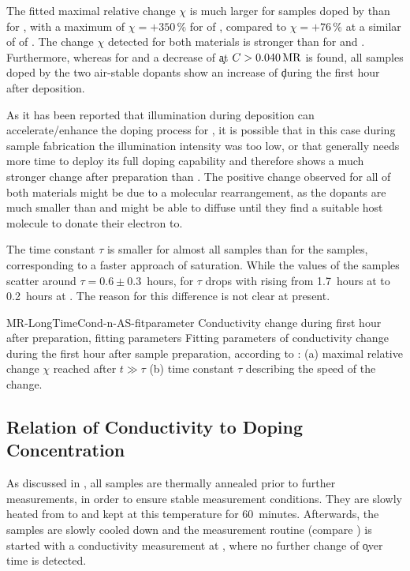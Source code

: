 The fitted maximal relative change $\chi$ is much larger for samples doped by \aob than for \dmbi, with a maximum of $\chi=+350\,\percent$ for \C[0.026] of \aob, compared to $\chi=+76\,\percent$ at a similar \CLong of \C[0.027] of \dmbi. The change $\chi$ detected for both materials is stronger than for \CrPd and \WPd. Furthermore, whereas for \CrPd and \WPd a decrease of \c at $C>\SI{0.040}{MR}$ is found, all samples doped by the two air-stable dopants show an increase of \c during the first hour after deposition.

As it has been reported\cite{Li2006} that illumination during deposition can accelerate/enhance the doping process for \aob, it is possible that in this case during sample fabrication the illumination intensity was too low, or that \aob generally needs more time to deploy its full doping capability and therefore shows a much stronger change after preparation than \dmbi. The positive change observed for all \CLongs of both materials might be due to a molecular rearrangement, as the dopants are much smaller than \CS and might be able to diffuse until they find a suitable host molecule to donate their electron to.

The time constant $\tau$ is smaller for almost all \dmbi samples than for the \aob samples, corresponding to a faster approach of saturation. While the values of the \dmbi samples scatter around $\tau=0.6\pm0.3$~hours, for \aob $\tau$ drops with rising \CLong from 1.7~hours at \C[0.007] to 0.2~hours at \C[0.510]. The reason for this difference is not clear at present.

\cBild
{MR-LongTimeCond-n-AS-fitparameter}
{Conductivity change during first hour after preparation, fitting parameters}
{Fitting parameters of conductivity change during the first hour after sample preparation, according to : (a) maximal relative change $\chi$ reached after $t\gg\tau$ (b) time constant $\tau$ describing the speed of the change.
}

\subsection{Relation of Conductivity to Doping Concentration} \label{sec:ResASCondMR}

As discussed in , all samples are thermally annealed prior to further measurements, in order to ensure stable measurement conditions. They are slowly heated from \T[25] to  and kept at this temperature for 60~minutes. Afterwards, the samples are slowly cooled down and the measurement routine (compare ) is started with a conductivity measurement at \T[25], where no further change of \c over time is detected.

